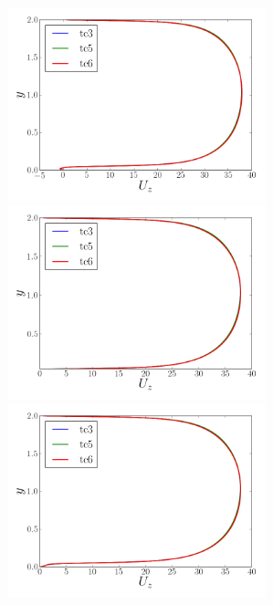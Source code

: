\documentclass[12pt,oneside,a4paper]{article}
\begin{document}
\begin{figure}
\centering
\includegraphics[width=7.5cm]{images/CFD_meshIndependence/X1_Uz.png}\hfill \includegraphics[width=7.5cm]{images/CFD_meshIndependence/X2_Uz.png}\\
\includegraphics[width=7.5cm]{images/CFD_meshIndependence/X3_Uz.png}
\end{figure}
\end{document}
